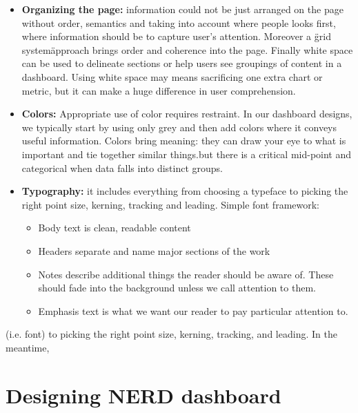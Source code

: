 \documentclass[a4paper,12pt]{report}
\begin{document}
\begin{itemize}
\item \textbf{Organizing the page: } information could not be just arranged on the page without order, semantics and taking into account where people looks first, where information should be to capture user's attention.
Moreover a \"grid system\" approach brings order and coherence into the page. Finally white space can be used to delineate sections or help users see groupings of content in a dashboard. Using white space may means sacrificing one extra chart or metric, but it can make a huge difference in user comprehension.

\item \textbf{Colors:}
Appropriate use of color requires restraint. In our dashboard designs, we typically start by using only grey and then add colors where it conveys useful information.
Colors bring meaning: they can draw your eye to what is important and tie together similar things.but there is a critical mid-point and categorical when data falls into distinct groups.

\item \textbf{Typography: }it includes everything from choosing a typeface to picking the right point size, kerning, tracking and leading.
Simple font framework:
\begin{itemize}                                    
\item Body text is clean, readable content
\item Headers separate and name major sections of the work                                                       
\item Notes describe additional things the reader should be aware of. These should fade into the background unless we call attention to them.
\item Emphasis text is what we want our reader to pay particular attention to.   
\end{itemize}
\end{itemize}

(i.e. font) to picking the right point size, kerning, tracking, and leading. In the meantime,
\chapter{Designing NERD dashboard}
\end{document}

